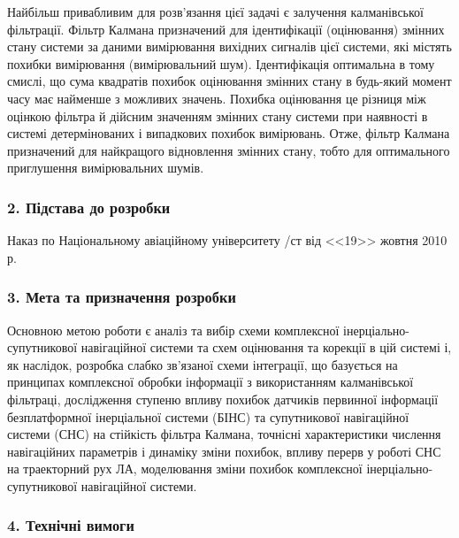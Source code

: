 Найбільш привабливим для розв’язання цієї задачі є залучення калманівської фільтрації. 
Фільтр Калмана призначений для ідентифікації (оцінювання) змінних стану системи за даними 
вимірювання вихідних сигналів цієї системи, які містять похибки вимірювання (вимірювальний шум). 
Ідентифікація оптимальна в тому смислі, що сума квадратів похибок оцінювання змінних стану
в будь-який момент часу має найменше з можливих значень. Похибка оцінювання це різниця 
між оцінкою фільтра й дійсним значенням змінних стану системи при наявності в системі 
детермінованих і випадкових похибок вимірювань. Отже, фільтр Калмана призначений для 
найкращого  відновлення змінних стану, тобто для оптимального приглушення вимірювальних шумів.

\subsubsection*{2. Підстава до розробки}

Наказ по Національному авіаційному університету /ст від <<19>> жовтня 2010 р.

\subsubsection*{3. Мета та призначення розробки}

Основною метою роботи є аналіз та вибір схеми комплексної інерціально-супутникової 
навігаційної системи та схем оцінювання та корекції в цій системі і, як наслідок, 
розробка слабко зв’язаної схеми інтеграції, що базується на принципах комплексної 
обробки інформації з використанням калманівської фільтраці, дослідження ступеню 
впливу похибок датчиків первинної інформації  безплатформної інерціальної системи 
(БІНС) та супутникової навігаційної системи (СНС) на стійкість фільтра Калмана, 
точнісні характеристики числення навігаційних параметрів і динаміку зміни похибок, 
впливу перерв у роботі СНС на траекторний рух ЛА, моделювання зміни похибок 
комплексної інерціально-супутникової навігаційної системи.

\subsubsection*{4. Технічні вимоги}

